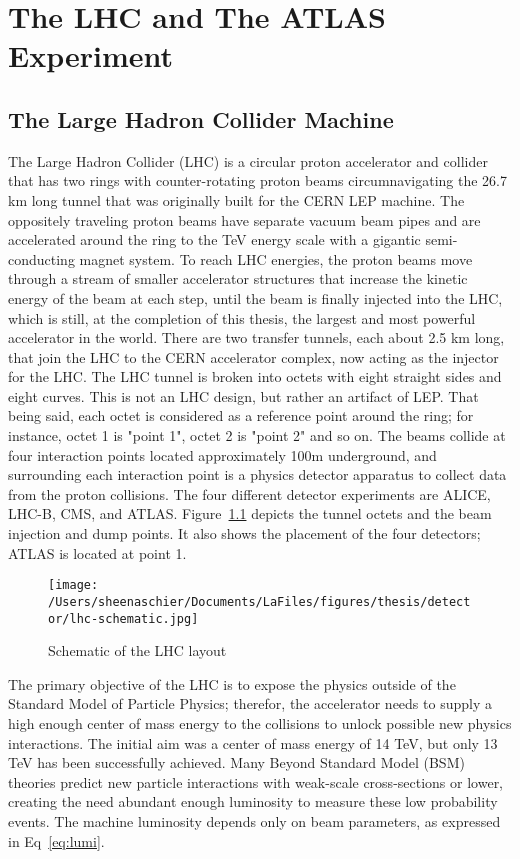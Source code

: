 \chapter{The LHC and The ATLAS Experiment}
\section{The Large Hadron Collider Machine}
\label{sec:LHC}

The Large Hadron Collider (LHC) is a circular proton accelerator and collider that has two rings with counter-rotating proton beams circumnavigating the 26.7 km long tunnel that was originally built for the CERN LEP machine.  The oppositely traveling proton beams have separate vacuum beam pipes and are accelerated around the ring to the TeV energy scale with a gigantic semi-conducting magnet system.  To reach LHC energies, the proton beams move through a stream of smaller accelerator structures that increase the kinetic energy of the beam at each step, until the beam is finally injected into the LHC, which is still, at the completion of this thesis, the largest and most powerful accelerator in the world.  There are two transfer tunnels, each about 2.5 km long, that join the LHC to the CERN accelerator complex, now acting as the injector for the LHC.  The LHC tunnel is broken into octets with eight straight sides and eight curves.  This is not an LHC design, but rather an artifact of LEP.   That being said, each octet is considered as a reference point around the ring; for instance, octet 1 is "point 1", octet 2 is "point 2" and so on.  The beams collide at four interaction points located approximately 100m underground, and surrounding each interaction point is a physics detector apparatus to collect data from the proton collisions.  The four different detector experiments are ALICE, LHC-B, CMS, and ATLAS.  Figure~\ref{fig:lhc} depicts the tunnel octets and the beam injection and dump points.  It also shows the placement of the four detectors; ATLAS is located at point 1.

  \begin{figure}[tbp]
    \centering
 \texttt{[image: /Users/sheenaschier/Documents/LaFiles/figures/thesis/detector/lhc-schematic.jpg]}
    \caption{Schematic of the LHC layout}
   \label{fig:lhc}
 \end{figure}
The primary objective of the LHC is to expose the physics outside of the Standard Model of Particle Physics; therefor, the accelerator needs to supply a high enough center of mass energy to the collisions to unlock possible new physics interactions.  The initial aim was a center of mass energy of 14 TeV, but only 13 TeV has been successfully achieved.  Many Beyond Standard Model (BSM) theories predict new particle interactions with weak-scale cross-sections or lower, creating the need abundant enough luminosity to measure these low probability events.  The machine luminosity depends only on beam parameters, as expressed in Eq~\ref{eq:lumi}.

